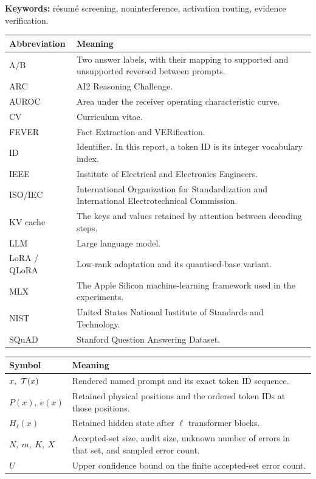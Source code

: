 \medskip
\noindent\textbf{Keywords:} résumé screening, noninterference, activation routing, evidence verification.

\clearpage
{}
\tableofcontents

\clearpage
{}
{}
\listoffigures
\bigskip
{}
{}
\listoftables

\clearpage
{}
\begingroup
\small
\noindent\begin{tabularx}{\linewidth}{@{}p{.19\linewidth}>{\raggedright\arraybackslash}X@{}}
\toprule
\textbf{Abbreviation} & \textbf{Meaning} \\
\midrule
A/B & Two answer labels, with their mapping to supported and unsupported reversed between prompts.\\
ARC & AI2 Reasoning Challenge.\\
AUROC & Area under the receiver operating characteristic curve.\\
CV & Curriculum vitae.\\
FEVER & Fact Extraction and VERification.\\
ID & Identifier. In this report, a token ID is its integer vocabulary index.\\
IEEE & Institute of Electrical and Electronics Engineers.\\
ISO/IEC & International Organization for Standardization and International Electrotechnical Commission.\\
KV cache & The keys and values retained by attention between decoding steps.\\
LLM & Large language model.\\
LoRA / QLoRA & Low-rank adaptation and its quantised-base variant.\\
MLX & The Apple Silicon machine-learning framework used in the experiments.\\
NIST & United States National Institute of Standards and Technology.\\
SQuAD & Stanford Question Answering Dataset.\\
\bottomrule
\end{tabularx}

\medskip
\noindent\begin{tabularx}{\linewidth}{@{}p{.19\linewidth}>{\raggedright\arraybackslash}X@{}}
\toprule
\textbf{Symbol} & \textbf{Meaning} \\
\midrule
\(x,\ \T(x)\) & Rendered named prompt and its exact token ID sequence.\\
\(P(x),\ e(x)\) & Retained physical positions and the ordered token IDs at those positions.\\
\(H_\ell(x)\) & Retained hidden state after \(\ell\) transformer blocks.\\
\(N,\ m,\ K,\ X\) & Accepted-set size, audit size, unknown number of errors in that set, and sampled error count.\\
\(U\) & Upper confidence bound on the finite accepted-set error count.\\
\bottomrule
\end{tabularx}
\endgroup

